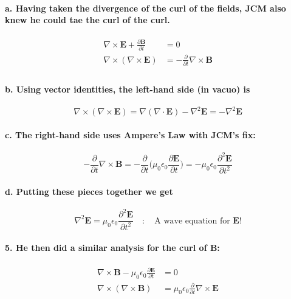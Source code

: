 \documentclass{article}
\begin{document}
\paragraph{\indent a. Having taken the divergence of the curl of the fields, JCM also knew he could tae the curl of the curl.}
\begin{align*}
    \nabla\times\boldsymbol{E}+\frac{\partial\boldsymbol{B}}{\partial t}&=0\\
    \nabla\times(\nabla\times\boldsymbol{E})&=-\frac{\partial}{\partial t}\nabla\times\boldsymbol{B}\\
\end{align*}
\paragraph{\indent b. Using vector identities, the left-hand side (in vacuo) is }
\begin{equation*}
    \nabla\times(\nabla\times\boldsymbol{E})=\nabla(\nabla\cdot\boldsymbol{E})-\nabla^2\boldsymbol{E}=-\nabla^2\boldsymbol{E}
\end{equation*}
\paragraph{\indent c. The right-hand side uses Ampere's Law with JCM's fix:}
\begin{equation*}
    -\frac{\partial}{\partial t}\nabla\times\boldsymbol{B}=-\frac{\partial}{\partial t}\bigg( \mu_0\epsilon_0\frac{\partial\boldsymbol{E}}{\partial t}\bigg) =-\mu_0\epsilon_0\frac{\partial^2\boldsymbol{E}}{\partial t^2}
\end{equation*}
\paragraph{\indent d. Putting these pieces together we get}
\begin{equation*}
    \nabla^2\boldsymbol{E}=\mu_0\epsilon_0\frac{\partial^2\boldsymbol{E}}{\partial t^2}\quad:\quad\text{A wave equation for $\boldsymbol{E}$!}
\end{equation*}
\paragraph{5. He then did a similar analysis for the curl of $\boldsymbol{B}$:}
\begin{align*}
    \nabla\times\boldsymbol{B}-\mu_0\epsilon_0\frac{\partial\boldsymbol{E}}{\partial t}&=0\\
    \nabla\times(\nabla\times\boldsymbol{B})&=\mu_0\epsilon_0\frac{\partial}{\partial t}\nabla\times\boldsymbol{E}\\
\end{align*} 
\end{document}
